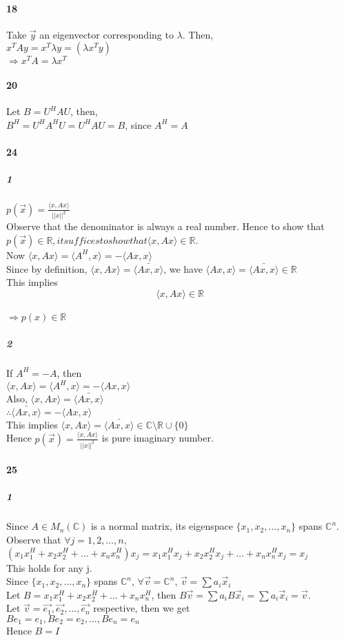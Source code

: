 \documentclass[10pt,letter]{article}
\begin{document}
\paragraph{18}
Take $\vec{y}$ an eigenvector corresponding to $\lambda$. Then, \\
$x^TAy=x^T\lambda y=(\lambda x^Ty)$\\
$\Rightarrow x^TA=\lambda x^T$
\paragraph{20}
Let $B=U^HAU$, then,\\
$B^H=U^HA^HU=U^HAU=B$, since $A^H=A$

\paragraph{24}
\subparagraph{1}
$p(\vec{x})=\frac{\langle x,Ax\rangle}{||x||^2}$\\
Observe that the denominator is always a real number. Hence to show that $p(\vec{x})\in \mathbb{R}, it suffices to show that \langle x, Ax\rangle\in\mathbb{R}$. \\
Now $\langle x,Ax\rangle=\langle A^H,x\rangle=-\langle Ax,x\rangle$\\
Since by definition, $\langle x,Ax\rangle=\bar{\langle Ax,x\rangle}$, we have $\langle Ax,x\rangle=\bar{\langle Ax,x\rangle} \in \mathbb{R}$\\
This implies $$\langle x,Ax\rangle \in \mathbb{R}$$\\
$\Rightarrow p(x)\in \mathbb{R}$
\subparagraph{2}
If $A^H=-A$, then \\
$\langle x,Ax\rangle=\langle A^H,x\rangle=-\langle Ax,x\rangle$\\
Also, $\langle x,Ax\rangle=\bar{\langle Ax,x\rangle}$\\
$\therefore \bar{\langle Ax,x\rangle}= -\langle Ax,x\rangle$\\
This implies $\langle x,Ax\rangle=\bar{\langle Ax,x\rangle} \in \mathbb{C}\setminus\mathbb{R} \cup\{0\}$\\
Hence $p(\vec{x})=\frac{\langle x,Ax\rangle}{||x||^2}$ is pure imaginary number.
\paragraph{25}
\subparagraph{1}
Since $A\in M_n(\mathbb{C})$ is a normal matrix, its eigenspace $\{x_1,x_2,\dots, x_n \}$ spans $\mathbb{C}^n$.\\
Observe that $\forall j=1,2,\dots, n$, \\
$(x_1x_1^H+x_2x_2^H+\dots+x_nx_n^H)x_j=x_1x_1^Hx_j+x_2x_2^Hx_j+\dots+x_nx_n^Hx_j=x_j$\\
This holds for any j.\\
Since $\{x_1,x_2,\dots, x_n \}$ spans $\mathbb{C}^n$, $\forall \vec{v}=\mathbb{C}^n$, $\vec{v}=\sum a_i\vec{x}_i$\\
Let $B=x_1x_1^H+x_2x_2^H+\dots+x_nx_n^H$, then $B\vec{v}=\sum a_iB\vec{x}_i=\sum a_i\vec{x}_i=\vec{v}$.\\
Let $\vec{v}=\vec{e_1},\vec{e_2},\dots,\vec{e_n}$ respective, then we get \\
$Be_1=e_1, Be_2=e_2, \dots, Be_n=e_n $\\
Hence $B=I$
\end{document}

